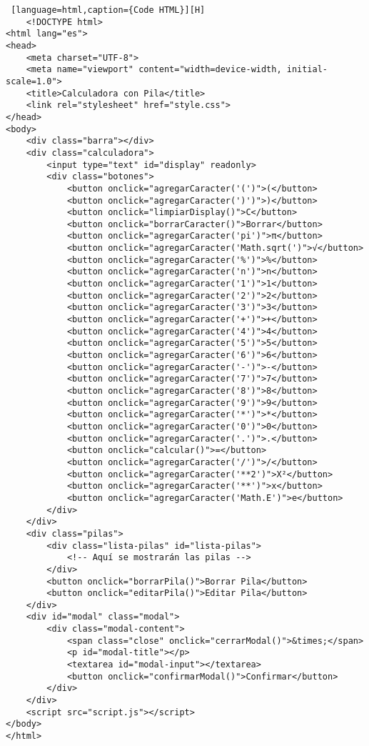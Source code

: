 \documentclass[14pt]{article}
\begin{document}
    \begin{lstlisting} [language=html,caption={Code HTML}][H]
    <!DOCTYPE html>
<html lang="es">
<head>
    <meta charset="UTF-8">
    <meta name="viewport" content="width=device-width, initial-scale=1.0">
    <title>Calculadora con Pila</title>
    <link rel="stylesheet" href="style.css">
</head>
<body>
    <div class="barra"></div>
    <div class="calculadora">
        <input type="text" id="display" readonly>
        <div class="botones">
            <button onclick="agregarCaracter('(')">(</button>
            <button onclick="agregarCaracter(')')">)</button>
            <button onclick="limpiarDisplay()">C</button>
            <button onclick="borrarCaracter()">Borrar</button>
            <button onclick="agregarCaracter('pi')">π</button>
            <button onclick="agregarCaracter('Math.sqrt(')">√</button>
            <button onclick="agregarCaracter('%')">%</button>
            <button onclick="agregarCaracter('n')">n</button>
            <button onclick="agregarCaracter('1')">1</button>
            <button onclick="agregarCaracter('2')">2</button>
            <button onclick="agregarCaracter('3')">3</button>
            <button onclick="agregarCaracter('+')">+</button>
            <button onclick="agregarCaracter('4')">4</button>
            <button onclick="agregarCaracter('5')">5</button>
            <button onclick="agregarCaracter('6')">6</button>
            <button onclick="agregarCaracter('-')">-</button>
            <button onclick="agregarCaracter('7')">7</button>
            <button onclick="agregarCaracter('8')">8</button>
            <button onclick="agregarCaracter('9')">9</button>
            <button onclick="agregarCaracter('*')">*</button>
            <button onclick="agregarCaracter('0')">0</button>
            <button onclick="agregarCaracter('.')">.</button>
            <button onclick="calcular()">=</button>
            <button onclick="agregarCaracter('/')">/</button>
            <button onclick="agregarCaracter('**2')">X²</button>
            <button onclick="agregarCaracter('**')">x</button>
            <button onclick="agregarCaracter('Math.E')">e</button>
        </div>
    </div>
    <div class="pilas">
        <div class="lista-pilas" id="lista-pilas">
            <!-- Aquí se mostrarán las pilas -->
        </div>
        <button onclick="borrarPila()">Borrar Pila</button>
        <button onclick="editarPila()">Editar Pila</button>
    </div>
    <div id="modal" class="modal">
        <div class="modal-content">
            <span class="close" onclick="cerrarModal()">&times;</span>
            <p id="modal-title"></p>
            <textarea id="modal-input"></textarea>
            <button onclick="confirmarModal()">Confirmar</button>
        </div>
    </div>
    <script src="script.js"></script>
</body>
</html>

    \end{lstlisting}
\end{document}
